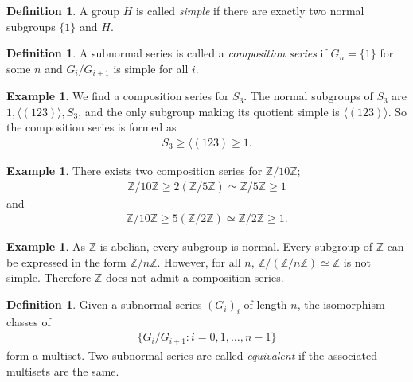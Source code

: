 \documentclass[12pt]{report}
\theoremstyle{plain}
\theoremstyle{remark}
\theoremstyle{definition}
\newtheorem{definition}[theorem]{Definition}
\newtheorem{example}[theorem]{Example}
\newcommand{\Z}{\mathbb{Z}}
\begin{document}
\begin{definition}
    A group $H$ is called \emph{simple} if there are exactly two normal subgroups $\{1\}$ and $H$.
\end{definition}

\begin{definition}
    A subnormal series is called a \emph{composition series} if $G_n=\{1\}$ for some $n$ and $G_i/G_{i+1}$ is simple for all $i$.
\end{definition}

\begin{example}
    We find a composition series for $S_3$. The normal subgroups of $S_3$ are $1, \langle (123)\rangle,S_3$, and the only subgroup making its quotient simple is $\langle(123)\rangle$. So the composition series is formed as
    \begin{align*}
        S_3\ge \langle(123)\ge 1.
    \end{align*}
\end{example}

\begin{example}
    There exists two composition series for $\Z/10\Z$;
    \begin{align*}
        \Z/10\Z \ge 2(\Z/5\Z)\simeq \Z/5\Z \ge 1
    \end{align*}
    and
    \begin{align*}
        \Z/10\Z\ge 5(\Z/2\Z) \simeq \Z/2\Z\ge 1.
    \end{align*}
\end{example}

\begin{example}
    As $\Z$ is abelian, every subgroup is normal. Every subgroup of $\Z$ can be expressed in the form $\Z/n\Z$. However, for all $n$, $\Z/(\Z/n\Z)\simeq \Z$ is not simple. Therefore $\Z$ does not admit a composition series.
\end{example}

\begin{definition}
    Given a subnormal series $(G_i)_i$ of length $n$, the isomorphism classes of
    \begin{align*}
        \{G_i/G_{i+1}:i=0,1,\dots,n-1\}
    \end{align*}
    form a multiset. Two subnormal series are called \emph{equivalent} if the associated multisets are the same.
\end{definition}
\end{document}
